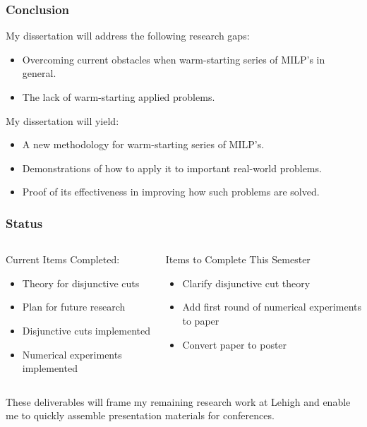 \documentclass{beamer}
\begin{document}
	\begin{frame}[t]
		\frametitle{Conclusion}
		\small
		My dissertation will address the following research gaps:
		\begin{itemize}
			\item Overcoming current obstacles when warm-starting series of MILP's in general.
			\item The lack of warm-starting applied problems.
		\end{itemize}
		My dissertation will yield:
		\begin{itemize}
			\item A new methodology for warm-starting series of MILP's.
			\item Demonstrations of how to apply it to important real-world problems.
			\item Proof of its effectiveness in improving how such problems are solved.
		\end{itemize}
		\normalsize
	\end{frame}

	\begin{frame}[t]
		\frametitle{Status}
		\small
		\begin{columns}[T]
			\begin{column}{0.5\textwidth}
				Current Items Completed:
				\begin{itemize}
					\item Theory for disjunctive cuts
					\item Plan for future research
					\item Disjunctive cuts implemented
					\item Numerical experiments implemented
				\end{itemize}
			\end{column}
			\begin{column}{0.5\textwidth}
				Items to Complete This Semester
				\begin{itemize}
					\item Clarify disjunctive cut theory
					\item Add first round of numerical experiments to paper
					\item Convert paper to poster
				\end{itemize}
			\end{column}
		\end{columns}
		\vspace{2.5cm}
		\begin{block}{}
			These deliverables will frame my remaining research work at Lehigh and enable me to quickly assemble presentation materials for conferences.
		\end{block}
		\normalsize
	\end{frame}
	
\end{document}
